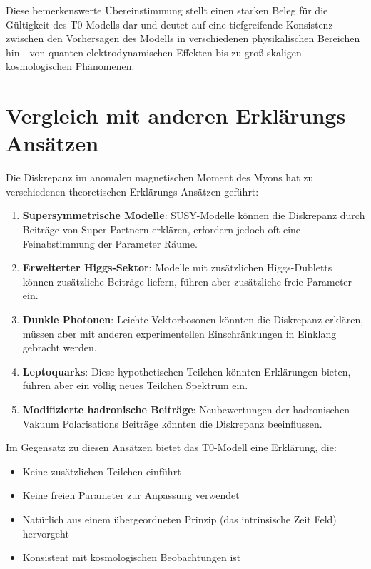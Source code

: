 \documentclass[12pt,a4paper]{article}
\begin{document}
	Diese bemerkenswerte Übereinstimmung stellt einen starken Beleg für die Gültigkeit des T0-Modells dar und deutet auf eine tiefgreifende Konsistenz zwischen den Vorhersagen des Modells in verschiedenen physikalischen Bereichen hin—von quanten elektrodynamischen Effekten bis zu groß skaligen kosmologischen Phänomenen.
	
	\section{Vergleich mit anderen Erklärungs Ansätzen}
	
	Die Diskrepanz im anomalen magnetischen Moment des Myons hat zu verschiedenen theoretischen Erklärungs Ansätzen geführt:
	
	\begin{enumerate}
		\item \textbf{Supersymmetrische Modelle}: SUSY-Modelle können die Diskrepanz durch Beiträge von Super Partnern erklären, erfordern jedoch oft eine Feinabstimmung der Parameter Räume.
		
		\item \textbf{Erweiterter Higgs-Sektor}: Modelle mit zusätzlichen Higgs-Dubletts können zusätzliche Beiträge liefern, führen aber zusätzliche freie Parameter ein.
		
		\item \textbf{Dunkle Photonen}: Leichte Vektorbosonen könnten die Diskrepanz erklären, müssen aber mit anderen experimentellen Einschränkungen in Einklang gebracht werden.
		
		\item \textbf{Leptoquarks}: Diese hypothetischen Teilchen könnten Erklärungen bieten, führen aber ein völlig neues Teilchen Spektrum ein.
		
		\item \textbf{Modifizierte hadronische Beiträge}: Neubewertungen der hadronischen Vakuum Polarisations Beiträge könnten die Diskrepanz beeinflussen.
	\end{enumerate}
	
	Im Gegensatz zu diesen Ansätzen bietet das T0-Modell eine Erklärung, die:
	
	\begin{itemize}
		\item Keine zusätzlichen Teilchen einführt
		\item Keine freien Parameter zur Anpassung verwendet
		\item Natürlich aus einem übergeordneten Prinzip (das intrinsische Zeit Feld) hervorgeht
		\item Konsistent mit kosmologischen Beobachtungen ist
	\end{itemize}
	
\end{document}
